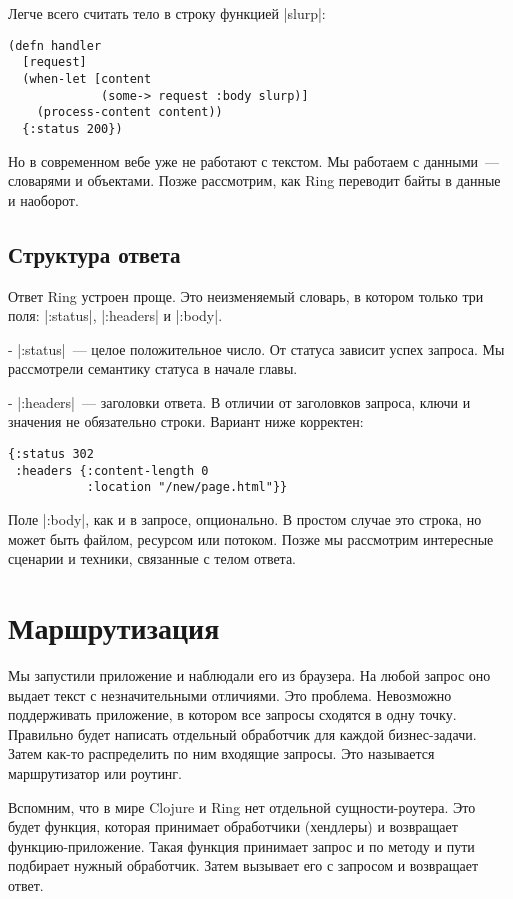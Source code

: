 Легче всего считать тело в строку функцией \spverb|slurp|:

\begin{verbatim}
(defn handler
  [request]
  (when-let [content
             (some-> request :body slurp)]
    (process-content content))
  {:status 200})
\end{verbatim}

Но в современном вебе уже не работают с текстом. Мы работаем с данными~---
словарями и объектами. Позже рассмотрим, как Ring переводит байты в данные и
наоборот.

\subsection{Структура ответа}

Ответ Ring устроен проще. Это неизменяемый словарь, в котором только три поля:
\spverb|:status|, \spverb|:headers| и \spverb|:body|.

- \spverb|:status|~--- целое положительное число. От статуса зависит успех запроса. Мы
  рассмотрели семантику статуса в начале главы.

- \spverb|:headers|~--- заголовки ответа. В отличии от заголовков запроса, ключи и
  значения не обязательно строки. Вариант ниже корректен:

\begin{verbatim}
{:status 302
 :headers {:content-length 0
           :location "/new/page.html"}}
\end{verbatim}

Поле \spverb|:body|, как и в запросе, опционально. В простом случае это строка, но
может быть файлом, ресурсом или потоком. Позже мы рассмотрим интересные сценарии
и техники, связанные с телом ответа.

\section{Маршрутизация}

Мы запустили приложение и наблюдали его из браузера. На любой запрос оно выдает
текст с незначительными отличиями. Это проблема. Невозможно поддерживать
приложение, в котором все запросы сходятся в одну точку. Правильно будет
написать отдельный обработчик для каждой бизнес-задачи. Затем как-то
распределить по ним входящие запросы. Это называется маршрутизатор или роутинг.

Вспомним, что в мире Clojure и Ring нет отдельной сущности-роутера. Это будет
функция, которая принимает обработчики (хендлеры) и возвращает
функцию-приложение. Такая функция принимает запрос и по методу и пути подбирает
нужный обработчик. Затем вызывает его с запросом и возвращает ответ.

